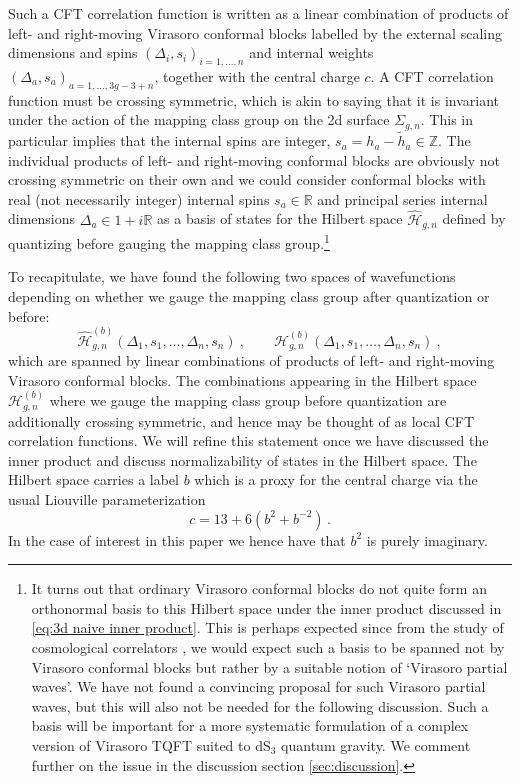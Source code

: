 \documentclass[12pt,a4paper]{article}
\newcommand{\be}{\begin{equation}}
\newcommand{\ee}{\end{equation}}
\newcommand\ZZ{\mathbb{Z}}
\begin{document}
Such a CFT correlation function is written as a linear combination of products of left- and right-moving Virasoro conformal blocks labelled by the external scaling dimensions and spins $(\Delta_i,s_i)_{i=1,\dots,n}$ and internal weights $(\Delta_a,s_a)_{a=1,\dots,3g-3+n}$, together with the central charge $c$.
A CFT correlation function must be crossing symmetric, which is akin to saying that it is invariant under the action of the mapping class group on the 2d surface $\Sigma_{g,n}$. This in particular implies that the internal spins are integer, $s_a=h_a-\tilde{h}_a \in \ZZ$. The individual products of left- and right-moving conformal blocks are obviously not crossing symmetric on their own and we could consider conformal blocks with real (not necessarily integer) internal spins $s_a\in\mathbb{R}$ and principal series internal dimensions $\Delta_a \in 1 + i\mathbb{R}$ as a basis of states for the Hilbert space $\hat{\mathcal{H}}_{g,n}$ defined by quantizing before gauging the mapping class group.\footnote{It turns out that ordinary Virasoro conformal blocks do not quite form an orthonormal basis to this Hilbert space under the inner product discussed in \eqref{eq:3d naive inner product}. This is perhaps expected since from the study of cosmological correlators \cite{Baumann:2022jpr}, we would expect such a basis to be spanned not by Virasoro conformal blocks but rather by a suitable notion of `Virasoro partial waves'. We have not found a convincing proposal for such Virasoro partial waves, but this will also not be needed for the following discussion. Such a basis will be important for a more systematic formulation of a complex version of Virasoro TQFT suited to dS$_3$ quantum gravity. We comment further on the issue in the discussion section \ref{sec:discussion}.}

To recapitulate, we have found the following two spaces of wavefunctions depending on whether we gauge the mapping class group after quantization or before:
\be 
\hat{\mathcal{H}}_{g,n}^{(b)}(\Delta_1,s_1,\dots,\Delta_n,s_n)~, \qquad
\mathcal{H}_{g,n}^{(b)}(\Delta_1,s_1,\dots,\Delta_n,s_n)~, 
\ee
which are spanned by linear combinations of products of left- and right-moving Virasoro conformal blocks. 
The combinations appearing in the Hilbert space $\mathcal{H}_{g,n}^{(b)}$ where we gauge the mapping class group before quantization are additionally crossing symmetric, and hence may be thought of as local CFT correlation functions. We will refine this statement once we have discussed the inner product and discuss normalizability of states in the Hilbert space. The Hilbert space carries a label $b$ which is a proxy for the central charge via the usual Liouville parameterization
\begin{equation}
    c = 13 + 6(b^{2}+b^{-2})\, .
\end{equation}
In the case of interest in this paper we hence have that $b^2$ is purely imaginary.
\end{document}
